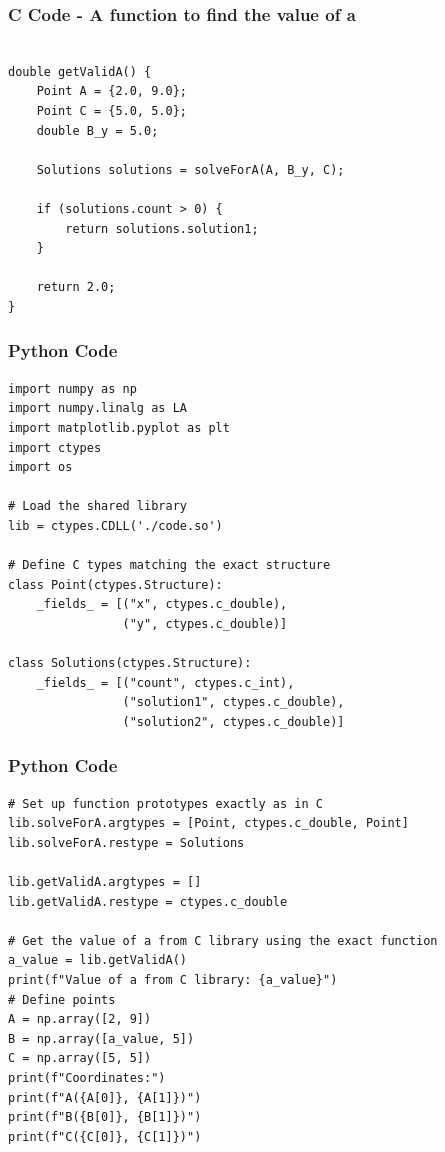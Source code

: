 \documentclass{beamer}
\begin{document}
\begin{frame}[fragile]
    \frametitle{C Code - A function to find the value of a}

    \begin{lstlisting}

double getValidA() {
    Point A = {2.0, 9.0};
    Point C = {5.0, 5.0};
    double B_y = 5.0;
    
    Solutions solutions = solveForA(A, B_y, C);
    
    if (solutions.count > 0) {
        return solutions.solution1;
    }
    
    return 2.0;
}

    \end{lstlisting}
\end{frame}


\begin{frame}[fragile]
    \frametitle{Python Code}
    \begin{lstlisting}
import numpy as np
import numpy.linalg as LA
import matplotlib.pyplot as plt
import ctypes
import os

# Load the shared library
lib = ctypes.CDLL('./code.so')

# Define C types matching the exact structure
class Point(ctypes.Structure):
    _fields_ = [("x", ctypes.c_double),
                ("y", ctypes.c_double)]

class Solutions(ctypes.Structure):
    _fields_ = [("count", ctypes.c_int),
                ("solution1", ctypes.c_double),
                ("solution2", ctypes.c_double)]

    \end{lstlisting}
\end{frame}

\begin{frame}[fragile]
    \frametitle{Python Code}
    \begin{lstlisting}
# Set up function prototypes exactly as in C
lib.solveForA.argtypes = [Point, ctypes.c_double, Point]
lib.solveForA.restype = Solutions

lib.getValidA.argtypes = []
lib.getValidA.restype = ctypes.c_double

# Get the value of a from C library using the exact function
a_value = lib.getValidA()
print(f"Value of a from C library: {a_value}")
# Define points
A = np.array([2, 9])
B = np.array([a_value, 5])
C = np.array([5, 5])
print(f"Coordinates:")
print(f"A({A[0]}, {A[1]})")
print(f"B({B[0]}, {B[1]})")
print(f"C({C[0]}, {C[1]})")

    \end{lstlisting}
\end{frame}
\end{document}
